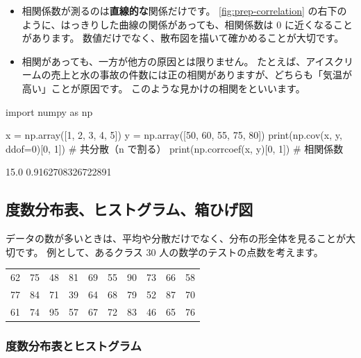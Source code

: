 \begin{exampoint}
  \begin{itemize}
    \item 相関係数が測るのは\textbf{直線的な}関係だけです。
      \cref{fig:prep-correlation} の右下のように、はっきりした曲線の関係があっても、相関係数は $0$ に近くなることがあります。
      数値だけでなく、散布図を描いて確かめることが大切です。
    \item 相関があっても、一方が他方の原因とは限りません。
      たとえば、アイスクリームの売上と水の事故の件数には正の相関がありますが、どちらも「気温が高い」ことが原因です。
      このような見かけの相関をといいます。
  \end{itemize}
\end{exampoint}

\begin{pycode}[共分散と相関係数]
import numpy as np

x = np.array([1, 2, 3, 4, 5])
y = np.array([50, 60, 55, 75, 80])
print(np.cov(x, y, ddof=0)[0, 1])   # 共分散（n で割る）
print(np.corrcoef(x, y)[0, 1])      # 相関係数
\end{pycode}

\begin{pyoutput}
15.0
0.9162708326722891
\end{pyoutput}

\subsection{度数分布表、ヒストグラム、箱ひげ図}

データの数が多いときは、平均や分散だけでなく、分布の形全体を見ることが大切です。
例として、あるクラス 30 人の数学のテストの点数を考えます。
\begin{center}
  \small
  \begin{tabular}{*{10}{c}}
    62 & 75 & 48 & 81 & 69 & 55 & 90 & 73 & 66 & 58 \\
    77 & 84 & 71 & 39 & 64 & 68 & 79 & 52 & 87 & 70 \\
    61 & 74 & 95 & 57 & 67 & 72 & 83 & 46 & 65 & 76 \\
  \end{tabular}
\end{center}

\subsubsection*{度数分布表とヒストグラム}

